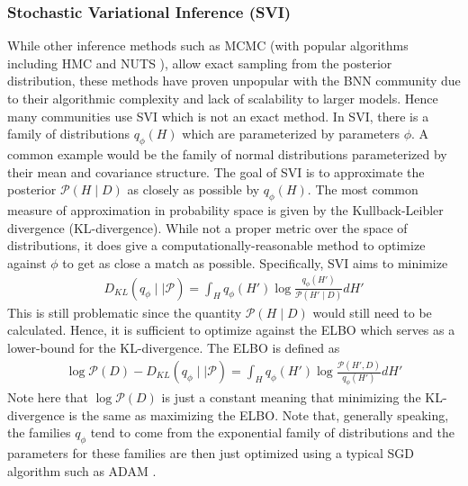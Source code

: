 \subsubsection{Stochastic Variational Inference (SVI)}
While other inference methods such as MCMC (with popular algorithms including HMC and NUTS \cite{betancourt_conceptual_2018} \cite{hoffman_no-u-turn_2011}), allow exact sampling from the posterior distribution, these methods have proven unpopular with the BNN community due to their algorithmic complexity and lack of scalability to larger models. Hence many communities use SVI which is not an exact method. In SVI, there is a family of distributions $q_{\phi}(H)$ which are parameterized by parameters $\phi$. A common example would be the family of normal distributions parameterized by their mean and covariance structure. The goal of SVI is to approximate the posterior $\mathcal{P}(H \mid D)$ as closely as possible by $q_{\phi}(H)$. The most common measure of approximation in probability space is given by the Kullback-Leibler divergence (KL-divergence). While not a proper metric over the space of distributions, it does give a computationally-reasonable method to optimize against $\phi$ to get as close a match as possible. Specifically, SVI aims to minimize
\begin{align*}
  D_{KL}(q_{\phi} \mid\mid \mathcal{P}) = \int_H q_{\phi}(H')\log \frac{q_{\phi}(H')}{\mathcal{P}(H' \mid D)} dH'
\end{align*} 
This is still problematic since the quantity $\mathcal{P}(H \mid D)$ would still need to be calculated. Hence, it is sufficient to optimize against the ELBO which serves as a lower-bound for the KL-divergence. The ELBO is defined as
\begin{align*}
  \log \mathcal{P}(D) - D_{KL}(q_{\phi} \mid\mid \mathcal{P}) = \int_H q_{\phi}(H')\log \frac{\mathcal{P}(H', D)}{q_{\phi}(H')} dH'
\end{align*}
Note here that $\log \mathcal{P}(D)$ is just a constant meaning that minimizing the KL-divergence is the same as maximizing the ELBO. Note that, generally speaking, the families $q_{\phi}$ tend to come from the exponential family of distributions and the parameters for these families are then just optimized using a typical SGD algorithm such as ADAM \cite{kingma_adam_2017}.

